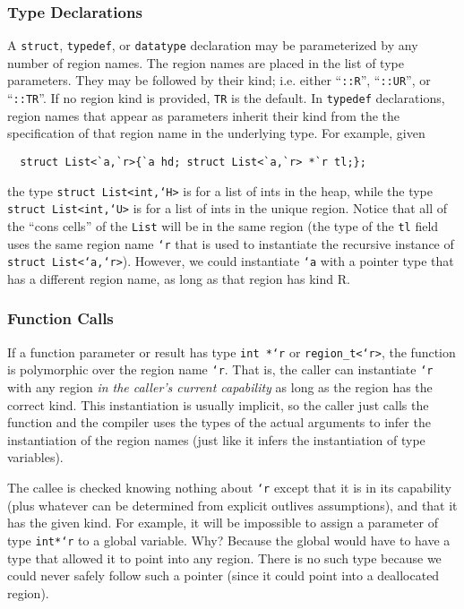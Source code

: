 \subsubsection{Type Declarations}

A \texttt{struct}, \texttt{typedef}, or \texttt{datatype} declaration may be
parameterized by any number of region names.  The region names are placed in
the list of type parameters.  They may be followed by their kind;
i.e. either ``\texttt{::R}'', ``\texttt{::UR}'', or ``\texttt{::TR}''.  If
no region kind is provided, \texttt{TR} is the default.  In \texttt{typedef}
declarations, region names that appear as parameters inherit their kind from
the the specification of that region name in the underlying type.  For
example, given
\begin{verbatim}
  struct List<`a,`r>{`a hd; struct List<`a,`r> *`r tl;};
\end{verbatim}
the type \texttt{struct List<int,`H>} is for a list of ints in the heap,
while the type \texttt{struct List<int,`U>} is for a list of ints in the
unique region.  Notice that all of the ``cons cells'' of the \texttt{List}
will be in the same region (the type of the \texttt{tl} field uses the same
region name \texttt{`r} that is used to instantiate the recursive instance
of \texttt{struct List<`a,`r>}).  However, we could instantiate \texttt{`a}
with a pointer type that has a different region name, as long as that region
has kind R.

\subsubsection{Function Calls}

If a function parameter or result has type \texttt{int *`r} or
\texttt{region_t<`r>}, the function is polymorphic over the region name
\texttt{`r}.  That is, the caller can instantiate \texttt{`r} with any
region \emph{in the caller's current capability} as long as the region has
the correct kind. This instantiation is usually implicit, so the caller just
calls the function and the compiler uses the types of the actual arguments
to infer the instantiation of the region names (just like it infers the
instantiation of type variables).

The callee is checked knowing nothing about \texttt{`r} except that it is in
its capability (plus whatever can be determined from explicit outlives
assumptions), and that it has the given kind.  For example, it will be
impossible to assign a parameter of type \texttt{int*`r} to a global
variable.  Why?  Because the global would have to have a type that allowed
it to point into any region.  There is no such type because we could never
safely follow such a pointer (since it could point into a deallocated
region).

